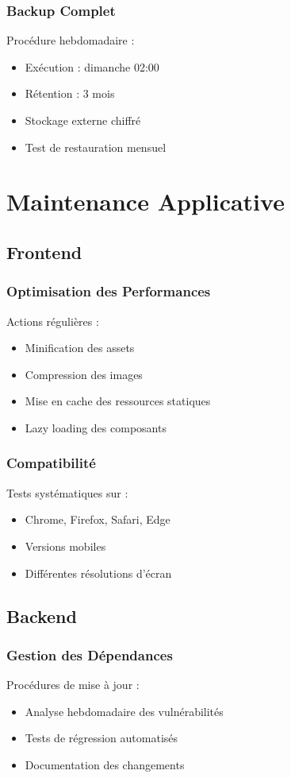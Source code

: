 \documentclass[14pt,a4paper]{report}
\begin{document}
\subsection{Backup Complet}
Procédure hebdomadaire :
\begin{itemize}
    \item Exécution : dimanche 02:00
    \item Rétention : 3 mois
    \item Stockage externe chiffré
    \item Test de restauration mensuel
\end{itemize}

\chapter{Maintenance Applicative}

\section{Frontend}
\subsection{Optimisation des Performances}
Actions régulières :
\begin{itemize}
    \item Minification des assets
    \item Compression des images
    \item Mise en cache des ressources statiques
    \item Lazy loading des composants
\end{itemize}

\subsection{Compatibilité}
Tests systématiques sur :
\begin{itemize}
    \item Chrome, Firefox, Safari, Edge
    \item Versions mobiles
    \item Différentes résolutions d'écran
\end{itemize}

\section{Backend}
\subsection{Gestion des Dépendances}
Procédures de mise à jour :
\begin{itemize}
    \item Analyse hebdomadaire des vulnérabilités
    \item Tests de régression automatisés
    \item Documentation des changements
\end{itemize}
\end{document}
